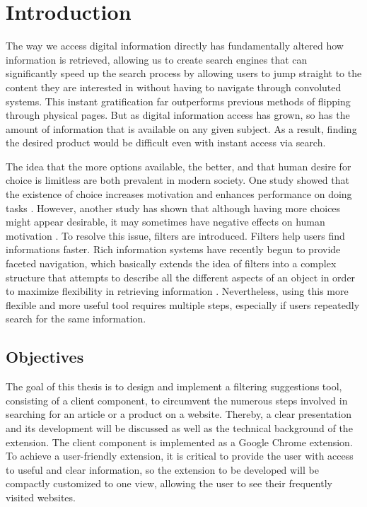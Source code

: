 \newpage
\chapter{Introduction}
The way we access digital information directly has fundamentally altered how information is retrieved, allowing us to create search engines that can significantly speed up the search process by allowing users to jump straight to the content they are interested in without having to navigate through convoluted systems. This instant gratification far outperforms previous methods of flipping through physical pages. But as digital information access has grown, so has the amount of information that is available on any given subject. As a result, finding the desired product would be difficult even with instant access via search.

The idea that the more options available, the better, and that human desire for choice is limitless are both prevalent in modern society. One study showed that the existence of choice increases motivation and enhances performance on doing tasks \autocite{zuckerman1978importance}. However, another study has shown that although having more choices might appear desirable, it may sometimes have negative effects on human motivation \autocite{iyengar2000choice}. To resolve this issue, filters are introduced. Filters help users find informations faster. Rich information systems have recently begun to provide faceted navigation, which basically extends the idea of filters into a complex structure that attempts to describe all the different aspects of an object in order to maximize flexibility in retrieving information \autocite{whitenton2014filters}. Nevertheless, using this more flexible and more useful tool requires multiple steps, especially if users repeatedly search for the same information.

\section{Objectives}
The goal of this thesis is to design and implement a filtering suggestions tool, consisting of a client component, to circumvent the numerous steps involved in searching for an article or a product on a website. Thereby, a clear presentation and its development will be discussed as well as the technical background of the extension. The client component is implemented as a Google Chrome extension. To achieve a user-friendly extension, it is critical to provide the user with access to useful and clear information, so the extension to be developed will be compactly customized to one view, allowing the user to see their frequently visited websites.

